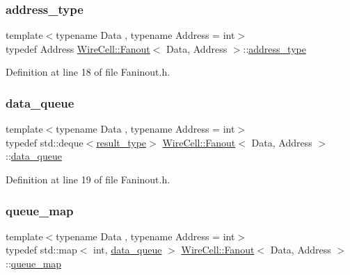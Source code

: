 \subsubsection{\texorpdfstring{address\+\_\+type}{address\_type}}
{\footnotesize\ttfamily template$<$typename Data , typename Address  = int$>$ \\
typedef Address \hyperlink{class_wire_cell_1_1_fanout}{Wire\+Cell\+::\+Fanout}$<$ Data, Address $>$\+::\hyperlink{class_wire_cell_1_1_fanout_ab1b06d1a80be80055b2e76ca512294c5}{address\+\_\+type}}



Definition at line 18 of file Faninout.\+h.

\mbox{\label{class_wire_cell_1_1_fanout_aa4d6a2413f61c755cc749775651b5c49}} 
\subsubsection{\texorpdfstring{data\+\_\+queue}{data\_queue}}
{\footnotesize\ttfamily template$<$typename Data , typename Address  = int$>$ \\
typedef std\+::deque$<$\hyperlink{class_wire_cell_1_1_fanout_ab2aa0c746557cf71d0454640c91ce0c5}{result\+\_\+type}$>$ \hyperlink{class_wire_cell_1_1_fanout}{Wire\+Cell\+::\+Fanout}$<$ Data, Address $>$\+::\hyperlink{class_wire_cell_1_1_fanout_aa4d6a2413f61c755cc749775651b5c49}{data\+\_\+queue}}



Definition at line 19 of file Faninout.\+h.

\mbox{\label{class_wire_cell_1_1_fanout_ad269356c60cd434e19c962907611e36d}} 
\subsubsection{\texorpdfstring{queue\+\_\+map}{queue\_map}}
{\footnotesize\ttfamily template$<$typename Data , typename Address  = int$>$ \\
typedef std\+::map$<$ int, \hyperlink{class_wire_cell_1_1_fanout_aa4d6a2413f61c755cc749775651b5c49}{data\+\_\+queue} $>$ \hyperlink{class_wire_cell_1_1_fanout}{Wire\+Cell\+::\+Fanout}$<$ Data, Address $>$\+::\hyperlink{class_wire_cell_1_1_fanout_ad269356c60cd434e19c962907611e36d}{queue\+\_\+map}}



